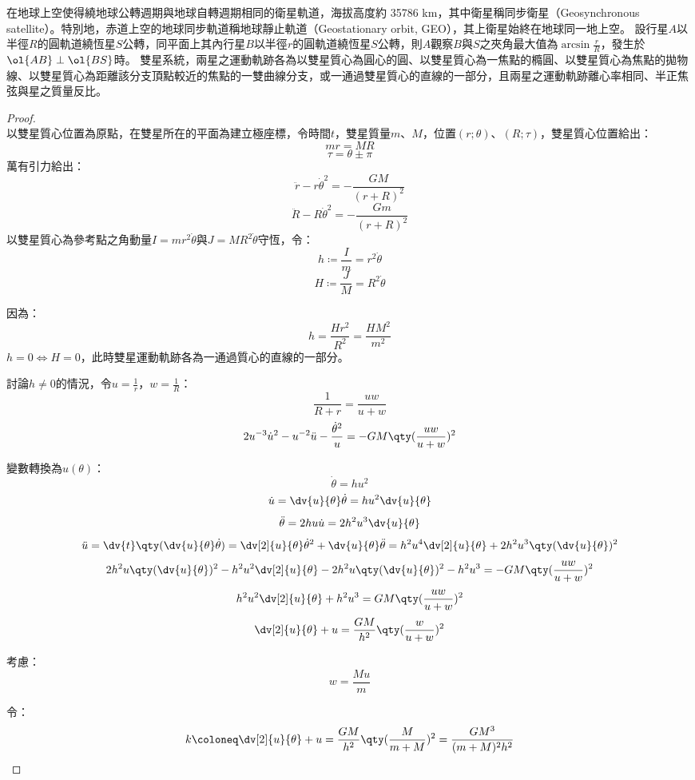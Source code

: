 \documentclass[a4paper,12pt]{article}
\begin{document}
在地球上空使得繞地球公轉週期與地球自轉週期相同的衛星軌道，海拔高度約 35786 km，其中衛星稱同步衛星（Geosynchronous satellite）。特別地，赤道上空的地球同步軌道稱地球靜止軌道（Geostationary orbit, GEO），其上衛星始終在地球同一地上空。
設行星$A$以半徑$R$的圓軌道繞恆星$S$公轉，同平面上其內行星$B$以半徑$r$的圓軌道繞恆星$S$公轉，則$A$觀察$B$與$S$之夾角最大值為$\arcsin\frac{r}{R}$，發生於$\ol{AB}\perp\ol{BS}$時。
雙星系統，兩星之運動軌跡各為以雙星質心為圓心的圓、以雙星質心為一焦點的橢圓、以雙星質心為焦點的拋物線、以雙星質心為距離該分支頂點較近的焦點的一雙曲線分支，或一通過雙星質心的直線的一部分，且兩星之運動軌跡離心率相同、半正焦弦與星之質量反比。
\begin{proof}\mbox{}\\
以雙星質心位置為原點，在雙星所在的平面為建立極座標，令時間$t$，雙星質量$m$、$M$，位置$(r;\theta)$、$(R;\tau)$，雙星質心位置給出：
\[mr=MR\]
\[\tau=\theta\pm\pi\]
萬有引力給出：
\[\ddot{r}-r\dot{\theta}^2=-\frac{GM}{(r+R)^2}\]
\[\ddot{R}-R\dot{\theta}^2=-\frac{Gm}{(r+R)^2}\]
以雙星質心為參考點之角動量$I=mr^2\dot{\theta}$與$J=MR^2\dot{\theta}$守恆，令：
\[h\coloneq\frac{I}{m}=r^2\dot{\theta}\]
\[H\coloneq\frac{J}{M}=R^2\dot{\theta}\]

因為：
\[h=\frac{Hr^2}{R^2}=\frac{HM^2}{m^2}\]
$h=0\iff H=0$，此時雙星運動軌跡各為一通過質心的直線的一部分。

討論$h\neq0$的情況，令$u=\frac{1}{r}$，$w=\frac{1}{R}$：
\[\frac{1}{R+r}=\frac{uw}{u+w}\]
\[2u^{-3}\dot{u}^2-u^{-2}\ddot{u}-\frac{\dot{\theta}^2}{u}=-GM\qty(\frac{uw}{u+w})^2\]

變數轉換為$u(\theta)$：
\[\dot{\theta}=h u^2\]
\[\dot{u}=\dv{u}{\theta}\dot{\theta}=h u^2\dv{u}{\theta}\]
\[\ddot{\theta}=2h u\dot{u}=2h^2u^3\dv{u}{\theta}\]
\[\ddot{u}=\dv{t}\qty(\dv{u}{\theta}\dot{\theta})=\dv[2]{u}{\theta}\dot{\theta}^2+\dv{u}{\theta}\ddot{\theta}=h^2u^4\dv[2]{u}{\theta}+2h^2u^3\qty(\dv{u}{\theta})^2\]
\[2h^2u\qty(\dv{u}{\theta})^2-h^2u^2\dv[2]{u}{\theta}-2h^2u\qty(\dv{u}{\theta})^2-h^2u^3=-GM\qty(\frac{uw}{u+w})^2\]
\[h^2u^2\dv[2]{u}{\theta}+h^2u^3=GM\qty(\frac{uw}{u+w})^2\]
\[\dv[2]{u}{\theta}+u=\frac{GM}{h^2}\qty(\frac{w}{u+w})^2\]

考慮：
\[w=\frac{Mu}{m}\]

令：
\[k\coloneq\dv[2]{u}{\theta}+u=\frac{GM}{h^2}\qty(\frac{M}{m+M})^2=\frac{GM^3}{(m+M)^2h^2}\]


\end{proof}
\end{document}
